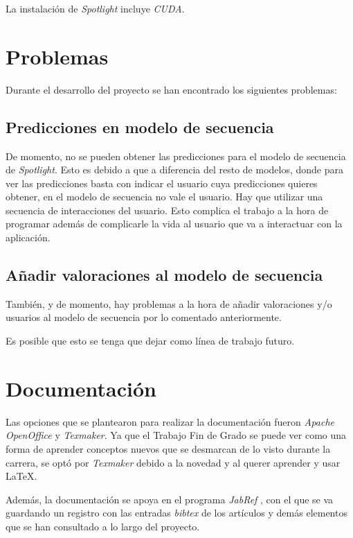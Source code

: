 La instalación de \textit{Spotlight} incluye \textit{CUDA}.

\section{Problemas}\label{problemas}
Durante el desarrollo del proyecto se han encontrado los siguientes problemas:

\subsection{Predicciones en modelo de secuencia}\label{predicciones-secuencia}
De momento, no se pueden obtener las predicciones para el modelo de secuencia de \textit{Spotlight}. Esto es debido a que a diferencia del resto de modelos, donde para ver las predicciones basta con indicar el usuario cuya predicciones quieres obtener, en el modelo de secuencia no vale el usuario. Hay que utilizar una secuencia de interacciones del usuario. Esto complica el trabajo a la hora de programar además de complicarle la vida al usuario que va a interactuar con la aplicación.

\subsection{Añadir valoraciones al modelo de secuencia}\label{valoraciones-secuencia}
También, y de momento, hay problemas a la hora de añadir valoraciones y/o usuarios al modelo de secuencia por lo comentado anteriormente.

Es posible que esto se tenga que dejar como línea de trabajo futuro.

\section{Documentación}\label{documentacion}
Las opciones que se plantearon para realizar la documentación fueron \textit{Apache OpenOffice} y \textit{Texmaker}. Ya que el Trabajo Fin de Grado se puede ver como una forma de aprender conceptos nuevos que se desmarcan de lo visto durante la carrera, se optó por \textit{Texmaker} debido a la novedad y al querer aprender y usar \LaTeX{}.

Además, la documentación se apoya en el programa \textit{JabRef} \cite{jabref}, con el que se va guardando un registro con las entradas \textit{bibtex} de los artículos y demás elementos que se han consultado a lo largo del proyecto.
